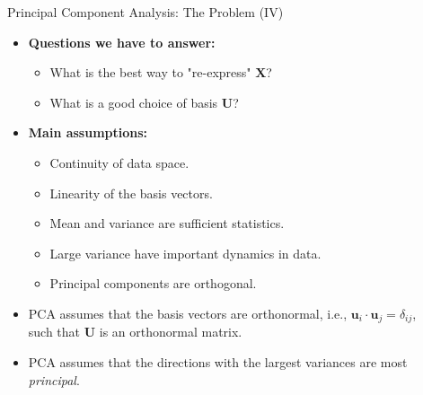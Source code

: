 \begin{frame}{Principal Component Analysis: The Problem (IV)}
	\begin{itemize}
		\item \textbf{Questions we have to answer:}
		\begin{itemize}
			\item What is the best way to "re-express" $\mathbf{X}$?
			\item What is a good choice of basis $\mathbf{U}$?
		\end{itemize}
		\item \textbf{Main assumptions:}
		\begin{itemize}
			\item Continuity of data space.
			\item Linearity of the basis vectors.
			\item Mean and variance are sufficient statistics.
			\item Large variance have important dynamics in data.
			\item Principal components are orthogonal.
		\end{itemize}
		\item PCA assumes that the basis vectors are orthonormal, i.e., 
		$\mathbf{u}_i\cdot\mathbf{u}_j = \delta_{ij}$, \\
		such that $\mathbf{U}$ is an orthonormal matrix.
		\item PCA assumes that the directions with the largest variances are 
		most \emph{principal}.
	\end{itemize}
\end{frame}

